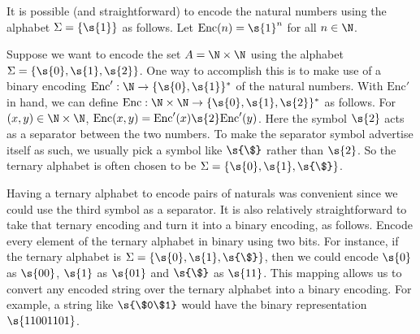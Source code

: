 \begin{flex}
\begin{example} \label{example:Unary-encoding-of-naturals}
It is possible (and straightforward) to encode the natural numbers using the alphabet $\Sigma = \{\s{1}\}$ as follows. Let $\text{Enc}(n) = \s{1}^n$ for all $n \in \N$.
\end{example}

\begin{example} \label{example:Ternary-encoding-of-pairs-of-naturals}
Suppose we want to encode the set $A = \N \times \N$ using the alphabet $\Sigma = \{\s{0},\s{1},\s{2}\}$. One way to accomplish this is to make use of a binary encoding $\text{Enc}': \N \to \{\s{0},\s{1}\}^*$ of the natural numbers. With $\text{Enc}'$ in hand, we can define $\text{Enc} : \N \times \N \to \{\s{0},\s{1},\s{2}\}^*$ as follows. For $(x,y) \in \N \times \N$, $\text{Enc}(x,y) = \text{Enc}'(x)\s{2}\text{Enc}'(y)$. Here the symbol $\s{2}$ acts as a separator between the two numbers. To make the separator symbol advertise itself as such, we usually pick a symbol like $\s{\$}$ rather than $\s{2}$. So the ternary alphabet is often chosen to be $\Sigma = \{\s{0},\s{1},\s{\$}\}$.
\end{example}

\begin{example} \label{example:Binary-encoding-of-pairs-of-naturals}
Having a ternary alphabet to encode pairs of naturals was convenient since we could use the third symbol as a separator. It is also relatively straightforward to take that ternary encoding and turn it into a binary encoding, as follows. Encode every element of the ternary alphabet in binary using two bits. For instance, if the ternary alphabet is $\Sigma = \{\s{0},\s{1},\s{\$}\}$, then we could encode $\s{0}$ as $\s{00}$, $\s{1}$ as $\s{01}$ and $\s{\$}$ as $\s{11}$. This mapping allows us to convert any encoded string over the ternary alphabet into a binary encoding. For example, a string like $\s{\$0\$1}$ would have the binary representation $\s{11001101}$.
\end{example}


\end{flex}
